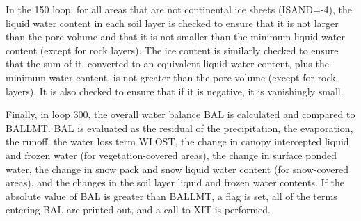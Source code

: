 In the 150 loop, for all areas that are not continental ice sheets (I\+S\+A\+N\+D=-\/4), the liquid water content in each soil layer is checked to ensure that it is not larger than the pore volume and that it is not smaller than the minimum liquid water content (except for rock layers). The ice content is similarly checked to ensure that the sum of it, converted to an equivalent liquid water content, plus the minimum water content, is not greater than the pore volume (except for rock layers). It is also checked to ensure that if it is negative, it is vanishingly small.

Finally, in loop 300, the overall water balance B\+A\+L is calculated and compared to B\+A\+L\+L\+M\+T. B\+A\+L is evaluated as the residual of the precipitation, the evaporation, the runoff, the water loss term W\+L\+O\+S\+T, the change in canopy intercepted liquid and frozen water (for vegetation-\/covered areas), the change in surface ponded water, the change in snow pack and snow liquid water content (for snow-\/covered areas), and the changes in the soil layer liquid and frozen water contents. If the absolute value of B\+A\+L is greater than B\+A\+L\+L\+M\+T, a flag is set, all of the terms entering B\+A\+L are printed out, and a call to X\+I\+T is performed.